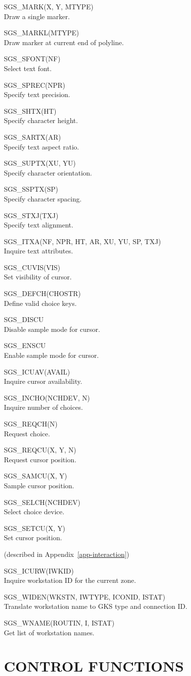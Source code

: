\documentclass[11pt]{article}
\newcommand{\hyperref}[4]{#2\ref{#4}#3}
\newcommand{\htmlref}[2]{#1}
\newcommand{\routinehead}[1]{\vspace{\bigskipamount}{\large\bf#1}}
\newenvironment{routinelist}{\begin{list}{}{\setlength{\leftmargin}{2cm}
                             \setlength{\parsep}{\smallskipamount}}}{\end{list}}
\newcommand{\routine}[2]{\item\hspace{-1cm}#1#2\\}
\newcommand{\routinehead}[1]{\subsection{#1}}
\newcommand{\routine}[2]{\item \htmlref{#1}{#1}#2\\}
\begin{document}
\routinehead{Plotting Markers}
\begin{routinelist}
\routine {SGS\_MARK}{(X, Y, MTYPE)}
   Draw a single marker.
\routine {SGS\_MARKL}{(MTYPE)}
   Draw marker at current end of polyline.
\end{routinelist}

\routinehead{Attributes of Characters}
\begin{routinelist}
\routine {SGS\_SFONT}{(NF)}
   Select text font.
\routine {SGS\_SPREC}{(NPR)}
   Specify text precision.
\routine {SGS\_SHTX}{(HT)}
   Specify character height.
\routine {SGS\_SARTX}{(AR)}
   Specify text aspect ratio.
\routine {SGS\_SUPTX}{(XU, YU)}
   Specify character orientation.
\routine {SGS\_SSPTX}{(SP)}
   Specify character spacing.
\routine {SGS\_STXJ}{(TXJ)}
   Specify text alignment.
\routine {SGS\_ITXA}{(NF, NPR, HT, AR, XU, YU, SP, TXJ)}
   Inquire text attributes.
\end{routinelist}

\routinehead{Input}
\begin{routinelist}
\routine {SGS\_CUVIS}{(VIS)}
   Set visibility of cursor.
\routine {SGS\_DEFCH}{(CHOSTR)}
   Define valid choice keys.
\routine {SGS\_DISCU}{}
   Disable sample mode for cursor.
\routine {SGS\_ENSCU}{}
   Enable sample mode for cursor.
\routine {SGS\_ICUAV}{(AVAIL)}
   Inquire cursor availability.
\routine {SGS\_INCHO}{(NCHDEV, N)}
   Inquire number of choices.
\routine {SGS\_REQCH}{(N)}
   Request choice.
\routine {SGS\_REQCU}{(X, Y, N)}
   Request cursor position.
\routine {SGS\_SAMCU}{(X, Y)}
   Sample cursor position.
\routine {SGS\_SELCH}{(NCHDEV)}
   Select choice device.
\routine {SGS\_SETCU}{(X, Y)}
   Set cursor position.
\end{routinelist}

\routinehead{GKS Inquiries} (described in
\hyperref{this appendix}{Appendix~}{}{app-interaction})
\begin{routinelist}
\routine {SGS\_ICURW}{(IWKID)}
   Inquire workstation ID for the current zone.
\routine {SGS\_WIDEN}{(WKSTN, IWTYPE, ICONID, ISTAT)}
   Translate workstation name to GKS type and connection ID.
\routine {SGS\_WNAME}{(ROUTIN, I, ISTAT)}
   Get list of workstation names.
\end{routinelist}

\section {CONTROL FUNCTIONS}\label{sec-control}
\end{document}
